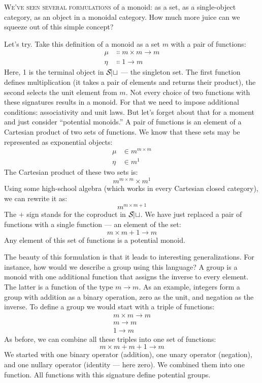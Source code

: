 
\lettrine[lhang=0.17]{W}{e've seen several formulations} of a monoid: as a set, as a
single-object category, as an object in a monoidal category. How much
more juice can we squeeze out of this simple concept?

Let's try. Take this definition of a monoid as a set $m$ with a
pair of functions:
\begin{align*}
\mu &\Colon m\times{}m \to m \\
\eta &\Colon 1 \to m
\end{align*}
Here, 1 is the terminal object in $\mathcal{S\mkern-3mu et}$ --- the singleton set.
The first function defines multiplication (it takes a pair of elements
and returns their product), the second selects the unit element from
$m$. Not every choice of two functions with these signatures
results in a monoid. For that we need to impose additional conditions:
associativity and unit laws. But let's forget about that for a moment
and just consider ``potential monoids.'' A pair of functions is an
element of a Cartesian product of two sets of functions. We know that
these sets may be represented as exponential objects:
\begin{align*}
\mu &\in m^{m\times{}m} \\
\eta &\in m^1
\end{align*}
The Cartesian product of these two sets is:
\[m^{m\times{}m}\times{}m^1\]
Using some high-school algebra (which works in every Cartesian closed
category), we can rewrite it as:
\[m^{m\times{}m + 1}\]
The $+$ sign stands for the coproduct in $\mathcal{S\mkern-3mu et}$. We have just
replaced a pair of functions with a single function --- an element of
the set:
\[m\times{}m + 1 \to m\]
Any element of this set of functions is a potential monoid.

The beauty of this formulation is that it leads to interesting
generalizations. For instance, how would we describe a group using this
language? A group is a monoid with one additional function that assigns
the inverse to every element. The latter is a function of the type
$m \to m$. As an example, integers form a group with
addition as a binary operation, zero as the unit, and negation as the
inverse. To define a group we would start with a triple of functions:
\begin{align*}
m\times{}m \to m \\
m \to m \\
1 \to m
\end{align*}
As before, we can combine all these triples into one set of functions:
\[m\times{}m + m + 1 \to m\]
We started with one binary operator (addition), one unary operator
(negation), and one nullary operator (identity --- here zero). We
combined them into one function. All functions with this signature
define potential groups.

